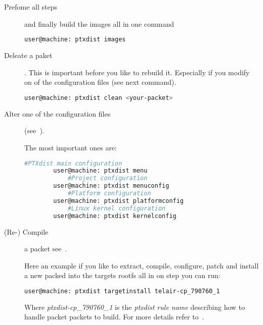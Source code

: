 \begin{description}
    \item[Prefome all steps] and finally build the images all in one
        command
        \begin{lstlisting}[language=bash,numbers=none,caption=Build all
        images with PTXdist]
        user@machine: ptxdist images
        \end{lstlisting}
    \item[Deleate a paket]. This is important before you like to rebuild it.
        Especially if you modify on of the configuration files (see next
        command).

        \begin{lstlisting}[language=bash,numbers=none,caption=Deleat a
        builded packet from PTXdsits scope]
        user@machine: ptxdist clean <your-packet>
        \end{lstlisting}
\newpage
    \item[Alter one of the configuration files] (see~\cite[PTXdist user
        manual]{ptxdist_manual}).

        The most important ones are:

        \lstset{style=bash}
        \begin{lstlisting}[language=bash,numbers=none,caption=Alter a
        configuration]
            #PTXdist main configuration
        user@machine: ptxdist menu
            #Project configuration
        user@machine: ptxdist menuconfig
            #Platform configuration
        user@machine: ptxdist platformconfig
            #Linux kernel configuration
        user@machine: ptxdist kernelconfig
        \end{lstlisting}
    \item[(Re-) Compile] a packet see~\cite[PTXdist’s build
        process]{ptxdist_manual}.

        Here an example if you like to extract, compile, configure, patch and
        install a new packed into the targets \gls{rootfs} all in on step you can
        run:

        \begin{lstlisting}[language=bash,numbers=none,caption=Compile and
        install a paket with PTXdist]
        user@machine: ptxdist targetinstall telair-cp_790760_1
        \end{lstlisting}

        Where \textit{ptxdist-cp\_790760\_1} is the \textit{ptxdist rule name}
        describing how to handle packet packets to build. For more details refer
        to~\cite[PTXdist development guide]{ptxdist_developer}.
\end{description}

